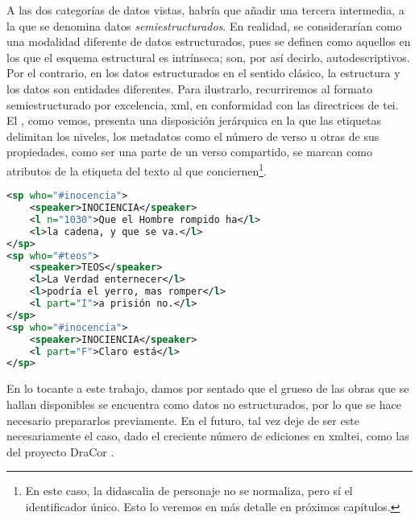 A las dos categorías de datos vistas, habría que añadir una tercera intermedia, a la que se denomina datos \textit{semiestructurados}. En realidad, se considerarían como una modalidad diferente de datos estructurados, pues se definen como aquellos en los que el esquema estructural es intrínseca; son, por así decirlo, autodescriptivos. Por el contrario, en los datos estructurados en el sentido clásico, la estructura y los datos son entidades diferentes. Para  ilustrarlo, recurriremos al formato semiestructurado por excelencia, \ac{xml}, en conformidad con las directrices de \ac{tei}. El , como vemos, presenta una disposición jerárquica en la que las etiquetas delimitan los niveles, los metadatos como el número de verso u otras de sus propiedades, como ser una parte de un verso compartido, se marcan como atributos de la etiqueta del texto al que conciernen\footnote{En este caso, la didascalia de personaje no se normaliza, pero sí el identificador único. Esto lo veremos en más detalle en próximos capítulos.}. 

\begin{lstlisting}[numbers=none, frame=none, keywordstyle=\ttfamily,  language=xml, upquote=true, label={list:xml}, caption={Datos semiestructurados.}]
<sp who="#inocencia">
    <speaker>INOCIENCIA</speaker>
    <l n="1030">Que el Hombre rompido ha</l>
    <l>la cadena, y que se va.</l>
</sp>
<sp who="#teos">
    <speaker>TEOS</speaker>
    <l>La Verdad enternecer</l>
    <l>podría el yerro, mas romper</l>
    <l part="I">a prisión no.</l>
</sp>
<sp who="#inocencia">
    <speaker>INOCIENCIA</speaker>
    <l part="F">Claro está</l>
</sp>
\end{lstlisting}
En lo tocante a este trabajo, damos por sentado que el grueso de las obras que se hallan disponibles se encuentra como datos no estructurados, por lo que se hace necesario prepararlos previamente. En el futuro, tal vez deje de ser este necesariamente el caso, dado el creciente número de ediciones en \ac{xmltei}, como las del proyecto DraCor \parencite{fischer2019}.

